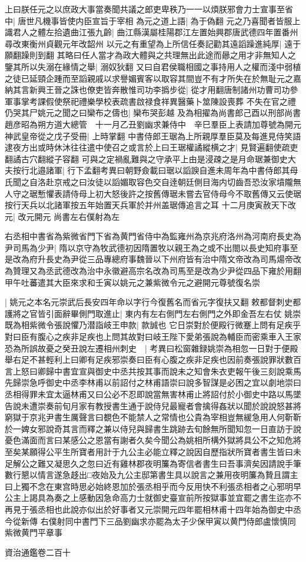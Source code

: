 上曰朕任元之以庶政大事當奏聞共議之郎吏卑秩乃一一以煩朕邪會力士宣事至省中|{
	唐世凡機事皆使内臣宣旨于宰相}
為元之道上語|{
	為于偽翻}
元之乃喜聞者皆服上識君人之體左拾遺曲江張九齡|{
	曲江縣漢屬桂陽郡江左置始興郡唐武德四年置番州尋改東衡州貞觀元年改韶州}
以元之有重望為上所信任奏記勸其遠謟躁進純厚|{
	遠于願翻躁則到翻}
其略曰任人當才為政大體與之共理無出此途而曏之用才非無知人之鑒其所以失溺在緣情之舉|{
	溺奴狄翻}
又曰自君侯職相國之事持用人之權而淺中弱植之徒已延頸企踵而至謟親戚以求譽媚賓客以取容其間豈不有才所失在於無耻元之嘉納其言新興王晉之誅也僚吏皆奔散惟司功李撝步從|{
	從才用翻唐制諸州功曹司功參軍事掌考課假使祭祀禮樂學校表疏書啟禄食祥異醫藥卜筮陳設喪葬}
不失在官之禮仍哭其尸姚元之聞之曰欒布之儔也|{
	欒布哭彭越}
及為相擢為尚書郎己酉以刑部尚書趙彦昭為朔方道大總管　十一月乙丑劉幽求兼侍中　辛巳羣臣上表請加尊號為開元神武皇帝從之戊子受冊|{
	上時掌翻}
中書侍郎王琚為上所親厚羣臣莫及每進見侍笑語逮夜方出或時休沐往往遣中使召之或言於上曰王琚權譎縱横之才|{
	見賢遍翻使疏吏翻譎古穴翻縱子容翻}
可與之定禍亂難與之守承平上由是浸疎之是月命琚兼御史大夫按行北邉諸軍|{
	行下孟翻考異曰朝野僉載曰琚以謟諛自進未周年為中書侍郎其母氏聞之自洛赴京戒之曰汝徒以謟媚取容色交自逹朝廷側目海内切齒吾恐汝家墳隴無人守之琚慙懼表請侍母上初大怒後許之按舊傳琚未嘗去官侍母今不取舊傳又云使琚按行天兵以北諸軍按五年始置天兵軍於并州盖琚傳追言之耳}
十二月庚寅赦天下改元|{
	改元開元}
尚書左右僕射為左

右丞相中書省為紫微省門下省為黄門省侍中為監雍州為京兆府洛州為河南府長史為尹司馬為少尹|{
	隋以京守為牧武德初因隋置牧以親王為之或不出閤以長史知府事至是改為府升長史為尹從三品專總府事魏晉以下州府皆有治中隋文帝改為司馬煬帝改為贊理又為丞武德改為治中永徽避高宗名改為司馬至是改為少尹從四品下雍於用翻}
甲午吐蕃遣其大臣來求和壬寅以姚元之兼紫微令元之避開元尊號復名崇

|{
	姚元之本名元崇武后長安四年命以字行今復舊名而省元字復扶又翻}
敕都督刺史都護將之官皆引面辭畢側門取進止|{
	東内有左右側門左右側門之外即金吾左右仗}
姚崇既為相紫微令張說懼乃潜詣岐王申款|{
	款誠也}
它日崇對於便殿行微蹇上問有足疾乎對曰臣有腹心之疾非足疾也上問其故對曰岐王陛下愛弟張說為輔臣而密乘車入王家恐為所誤故憂之癸丑說左遷相州刺史　|{
	考異曰松窗雜録姚崇為相忽一日對于便殿舉右足不甚輕利上曰卿有足疾邪崇奏曰臣有心腹之疾非足疾也因前奏張說罪狀數百言上怒曰卿歸中書宜宣與御史中丞共按其事而說未之知會朱衣吏報午後三刻說乘馬先歸崇急呼御史中丞李林甫以前詔付之林甫語崇曰說多智謀是必困之宜以劇地崇曰丞相得罪未宜太逼林甫又曰公必不忍即說當無害林甫止將詔付於小御史中路以馬墜告說未遭崇奏前旬月家有教授書生通于說侍兒最寵者會擒得姦狀以聞於說說怒甚將窮獄于京兆尹書生厲聲言曰覩色不能禁人之常情也公貴為宰相豈無緩急用人何靳靳於一婢女邪說奇其言而釋之兼以侍兒與歸書生跳跡去旬餘無所聞知忽一日直訪于說憂色滿面而言曰某感公之恩當有謝者久矣今聞公為姚相所構外獄將具公不之知危將至矣某願得公平生所寶者用計于九公主必能立釋之說因自歷指狀所寶者書生皆曰未足解公之難又凝思久之忽曰近有雞林郡夜明簾為寄信者書生曰吾事濟矣因請說手筆數行懇以情言遂急趍出□夜始及九公主邸第書生具以說言之兼用夜明簾為贄且謂主曰上獨不念在東宫時思必始終恩加於張丞相乎而今反用快不利張丞相者之心邪明早公主上謁具為奏之上感動因急命高力士就御史臺宣前所按獄事並宜罷之書生迄亦不再見于張丞相也此說亦似出於好事者又元崇開元四年罷相林甫十四年始為御史中丞今從新傳}
右僕射同中書門下三品劉幽求亦罷為太子少保甲寅以黄門侍郎盧懷慎同紫微黄門平章事

資治通鑑卷二百十
